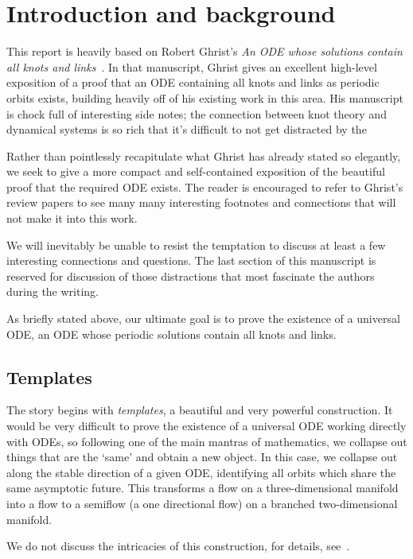 \documentclass[paper.tex]{subfiles}
\begin{document}
\section{Introduction and background}

This report is heavily based on Robert Ghrist's \emph{An ODE whose solutions contain all knots and links}~\cite{knottyode}. In that manuscript, Ghrist gives an excellent high-level exposition of a proof that an ODE containing
all knots and links as periodic orbits exists, building heavily off of his existing work in this area. His manuscript is chock full of interesting side notes; the connection between knot theory and dynamical systems is so rich
that it's difficult to not get distracted by the

Rather than pointlessly recapitulate what Ghrist has already stated so elegantly, we seek to give a more compact and self-contained exposition of the beautiful proof that the required ODE exists. The reader is encouraged to
refer to Ghrist's review papers \cite{knottyode}\cite{chaoticknots}to see many many interesting footnotes and connections that will not make it into this work.

We will inevitably be unable to resist the temptation to discuss at least a few interesting connections and questions. The last section of this manuscript is reserved for discussion of those distractions that most fascinate the
authors during the writing.

As briefly stated above, our ultimate goal is to prove the existence of a universal ODE, an ODE whose periodic solutions contain all knots and links.


\subsection{Templates}

The story begins with \emph{templates}, a beautiful and very powerful construction. It would be very difficult to prove the existence of a universal ODE working directly with ODEs, so following one of the main mantras
of mathematics, we collapse out things that are the `same' and obtain a new object. In this case, we collapse out along the stable direction of a given ODE, identifying all orbits which share the same asymptotic future.
This transforms a flow on a three-dimensional manifold into a flow to a semiflow (a one directional flow) on a branched two-dimensional manifold.

We do not discuss the intricacies of this construction, for details, see~\cite{bw1983b}.
\end{document}
